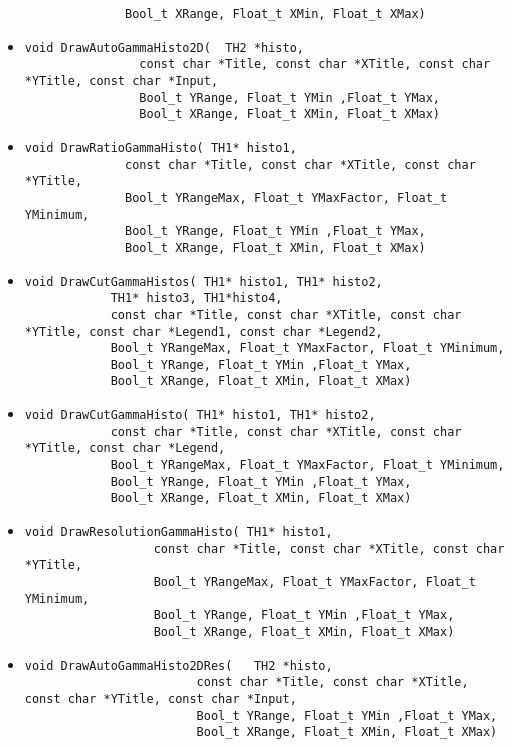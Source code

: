\begin{itemize}
\begin{lstlisting}
			  Bool_t XRange, Float_t XMin, Float_t XMax) 
		       	\end{lstlisting}
\item 	\begin{lstlisting}
void DrawAutoGammaHisto2D(	TH2 *histo,  
				const char *Title, const char *XTitle, const char *YTitle, const char *Input,
				Bool_t YRange, Float_t YMin ,Float_t YMax, 
				Bool_t XRange, Float_t XMin, Float_t XMax) 	       	 
		       	\end{lstlisting}
\item 	\begin{lstlisting}
void DrawRatioGammaHisto( TH1* histo1, 
			  const char *Title, const char *XTitle, const char *YTitle,
			  Bool_t YRangeMax, Float_t YMaxFactor, Float_t YMinimum,
			  Bool_t YRange, Float_t YMin ,Float_t YMax,  
			  Bool_t XRange, Float_t XMin, Float_t XMax)
		       	\end{lstlisting}
\item 	\begin{lstlisting}
void DrawCutGammaHistos( TH1* histo1, TH1* histo2, 
			TH1* histo3, TH1*histo4, 
			const char *Title, const char *XTitle, const char *YTitle, const char *Legend1, const char *Legend2,
			Bool_t YRangeMax, Float_t YMaxFactor, Float_t YMinimum,
			Bool_t YRange, Float_t YMin ,Float_t YMax,  
			Bool_t XRange, Float_t XMin, Float_t XMax) 		       	 
		       	\end{lstlisting}
\item 	\begin{lstlisting}
void DrawCutGammaHisto( TH1* histo1, TH1* histo2, 
			const char *Title, const char *XTitle, const char *YTitle, const char *Legend,
			Bool_t YRangeMax, Float_t YMaxFactor, Float_t YMinimum,
			Bool_t YRange, Float_t YMin ,Float_t YMax,  
			Bool_t XRange, Float_t XMin, Float_t XMax)
		       	\end{lstlisting}
\item 	\begin{lstlisting}
void DrawResolutionGammaHisto( TH1* histo1, 
			      const char *Title, const char *XTitle, const char *YTitle,
			      Bool_t YRangeMax, Float_t YMaxFactor, Float_t YMinimum,
			      Bool_t YRange, Float_t YMin ,Float_t YMax,  
			      Bool_t XRange, Float_t XMin, Float_t XMax)		       	 
		       	\end{lstlisting}
\item 	\begin{lstlisting}
void DrawAutoGammaHisto2DRes(	TH2 *histo,  
						const char *Title, const char *XTitle, const char *YTitle, const char *Input,
						Bool_t YRange, Float_t YMin ,Float_t YMax, 
						Bool_t XRange, Float_t XMin, Float_t XMax)
		       	\end{lstlisting}


\end{itemize}
